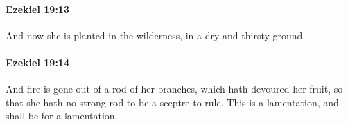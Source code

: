 		\paragraph{Ezekiel 19:13} %
			\label{EZEKIEL-19-13}

			And now she is planted in the wilderness, in a dry and thirsty ground.


		\paragraph{Ezekiel 19:14} %
			\label{EZEKIEL-19-14}

			And fire is gone out of a rod of her branches, which hath devoured her fruit, so that she hath no strong rod to be a sceptre to rule. This is a lamentation, and shall be for a lamentation.

